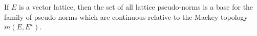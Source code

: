 If $E$ is a vector lattice, then the set of all lattice pseudo-norms is a base for the family of pseudo-norms which are continuous relative to the Mackey topology $m(E, E^{\star})$.
